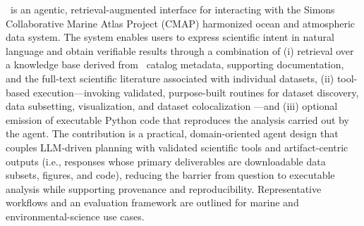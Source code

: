 \cmapagent\ is an agentic, retrieval-augmented interface for interacting with the Simons Collaborative Marine Atlas Project (CMAP) harmonized ocean and atmospheric data system.
The system enables users to express scientific intent in natural language and obtain verifiable results through a combination of
(i) retrieval over a knowledge base derived from \cmap\ catalog metadata, supporting documentation, and the full-text scientific literature associated with individual datasets,
(ii) tool-based execution---invoking validated, purpose-built routines for dataset discovery, data subsetting, visualization, and dataset colocalization ---and
(iii) optional emission of executable Python code that reproduces the analysis carried out by the agent.
The contribution is a practical, domain-oriented agent design that couples LLM-driven planning with validated scientific tools and artifact-centric outputs (i.e., responses whose primary deliverables are downloadable data subsets, figures, and code),
reducing the barrier from question to executable analysis while supporting provenance and reproducibility.
Representative workflows and an evaluation framework are outlined for marine and environmental-science use cases.
